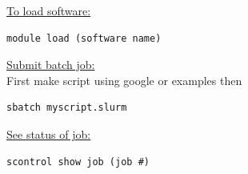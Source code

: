 \documentclass{article}
\begin{document}
\underline{To load software:}
\begin{lstlisting}
module load (software name)
\end{lstlisting}

\underline{Submit batch job:}\\

First make script using google or examples then 
\begin{lstlisting}
sbatch myscript.slurm
\end{lstlisting}

\underline{See status of job:}
\begin{lstlisting}
scontrol show job (job #)
\end{lstlisting}
\end{document}
